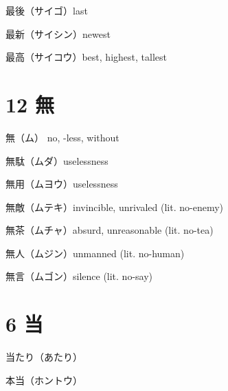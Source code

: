 最後（サイゴ）last

最新（サイシン）newest

最高（サイコウ）best, highest, tallest

\section{12 無}

無（ム） no, -less, without

無駄（ムダ）uselessness

無用（ムヨウ）uselessness

無敵（ムテキ）invincible, unrivaled (lit. no-enemy)

無茶（ムチャ）absurd, unreasonable (lit. no-tea)

無人（ムジン）unmanned (lit. no-human)

無言（ムゴン）silence (lit. no-say)

\section{6 当}

当たり（あたり）

本当（ホントウ）
